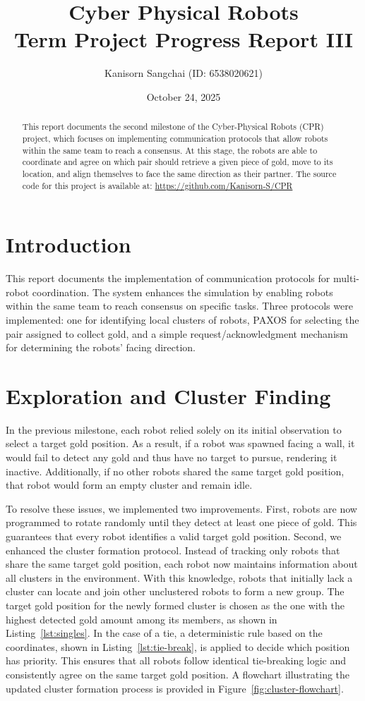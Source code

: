 \documentclass[12pt,a4paper]{article}
\title{Cyber Physical Robots\\Term Project Progress Report III}
\author{Kanisorn Sangchai (ID: 6538020621)}
\date{October 24, 2025}
\begin{document}
\maketitle

\begin{abstract}
This report documents the second milestone of the Cyber-Physical Robots (CPR) project, which focuses on implementing communication protocols that allow robots within the same team to reach a consensus. At this stage, the robots are able to coordinate and agree on which pair should retrieve a given piece of gold, move to its location, and align themselves to face the same direction as their partner. The source code for this project is available at: \url{https://github.com/Kanisorn-S/CPR}
\end{abstract}

\section{Introduction}
This report documents the implementation of communication protocols for multi-robot coordination. The system enhances the simulation by enabling robots within the same team to reach consensus on specific tasks. Three protocols were implemented: one for identifying local clusters of robots, PAXOS for selecting the pair assigned to collect gold, and a simple request/acknowledgment mechanism for determining the robots’ facing direction.

\section{Exploration and Cluster Finding}
In the previous milestone, each robot relied solely on its initial observation to select a target gold position. As a result, if a robot was spawned facing a wall, it would fail to detect any gold and thus have no target to pursue, rendering it inactive. Additionally, if no other robots shared the same target gold position, that robot would form an empty cluster and remain idle.

To resolve these issues, we implemented two improvements. First, robots are now programmed to rotate randomly until they detect at least one piece of gold. This guarantees that every robot identifies a valid target gold position. Second, we enhanced the cluster formation protocol. Instead of tracking only robots that share the same target gold position, each robot now maintains information about all clusters in the environment. With this knowledge, robots that initially lack a cluster can locate and join other unclustered robots to form a new group. The target gold position for the newly formed cluster is chosen as the one with the highest detected gold amount among its members, as shown in Listing~\ref{lst:singles}. In the case of a tie, a deterministic rule based on the coordinates, shown in Listing~\ref{lst:tie-break}, is applied to decide which position has priority. This ensures that all robots follow identical tie-breaking logic and consistently agree on the same target gold position. A flowchart illustrating the updated cluster formation process is provided in Figure~\ref{fig:cluster-flowchart}.
\end{document}
